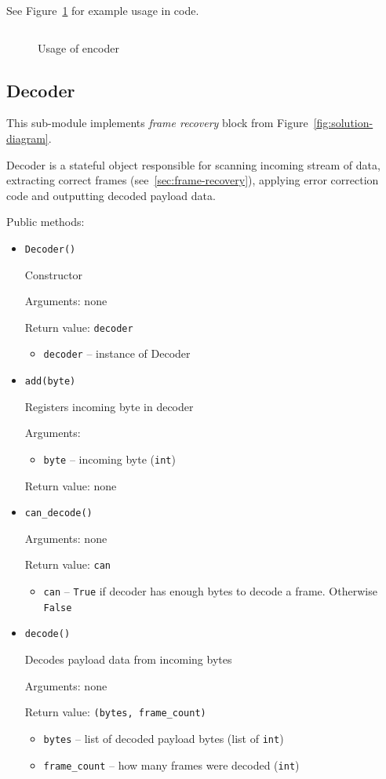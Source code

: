 \documentclass[english,bachelor,a4paper,oneside]{ppfcmthesis}
\begin{document}
See Figure~\ref{fig:encoder-example} for example usage in code.

\begin{figure}[p]
\centering
\inputminted[linenos]{python}{listings/encoder_example.py}
\caption{Usage of encoder}
\label{fig:encoder-example}
\end{figure}

\subsection{Decoder}

This sub-module implements \emph{frame recovery} block from Figure~\ref{fig:solution-diagram}.

Decoder is a stateful object responsible for scanning incoming stream of data, extracting correct frames (see~\ref{sec:frame-recovery}), applying error correction code and outputting decoded payload data.

Public methods:

\begin{itemize}
\item \verb|Decoder()|

  Constructor

  Arguments: none

  Return value: \verb|decoder|
  \begin{itemize}
  \item \verb|decoder| -- instance of Decoder
  \end{itemize}

\item \verb|add(byte)|

  Registers incoming byte in decoder

  Arguments:
  \begin{itemize}
  \item \verb|byte| -- incoming byte (\verb|int|)
  \end{itemize}

  Return value: none

\item \verb|can_decode()|

  Arguments: none

  Return value: \verb|can|
  \begin{itemize}
  \item \verb|can| -- \verb|True| if decoder has enough bytes to decode a frame. Otherwise \verb|False|
  \end{itemize}

\item \verb|decode()|

  Decodes payload data from incoming bytes

  Arguments: none

  Return value: \verb|(bytes, frame_count)|
  \begin{itemize}
  \item \verb|bytes| -- list of decoded payload bytes (list of \verb|int|)
  \item \verb|frame_count| -- how many frames were decoded (\verb|int|)
  \end{itemize}
\end{itemize}
\end{document}
